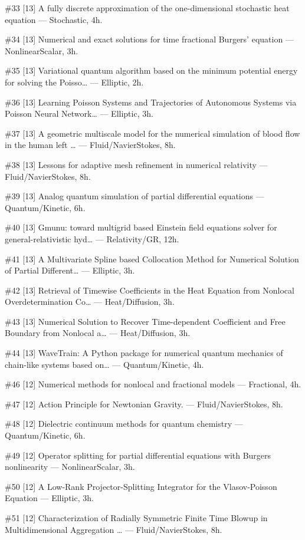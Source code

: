 \documentclass[10pt,letterpaper]{article}
\begin{document}
\#33 [13] A fully discrete approximation of the one-dimensional stochastic heat equation — Stochastic, 4h.

\#34 [13] Numerical and exact solutions for time fractional Burgers' equation — NonlinearScalar, 3h.

\#35 [13] Variational quantum algorithm based on the minimum potential energy for solving the Poisso… — Elliptic, 2h.

\#36 [13] Learning Poisson Systems and Trajectories of Autonomous Systems via Poisson Neural Network… — Elliptic, 3h.

\#37 [13] A geometric multiscale model for the numerical simulation of blood flow in the human left … — Fluid/NavierStokes, 8h.

\#38 [13] Lessons for adaptive mesh refinement in numerical relativity — Fluid/NavierStokes, 8h.

\#39 [13] Analog quantum simulation of partial differential equations — Quantum/Kinetic, 6h.

\#40 [13] Gmunu: toward multigrid based Einstein field equations solver for general-relativistic hyd… — Relativity/GR, 12h.

\#41 [13] A Multivariate Spline based Collocation Method for Numerical Solution of Partial Different… — Elliptic, 3h.

\#42 [13] Retrieval of Timewise Coefficients in the Heat Equation from Nonlocal Overdetermination Co… — Heat/Diffusion, 3h.

\#43 [13] Numerical Solution to Recover Time-dependent Coefficient and Free Boundary from Nonlocal a… — Heat/Diffusion, 3h.

\#44 [13] WaveTrain: A Python package for numerical quantum mechanics of chain-like systems based on… — Quantum/Kinetic, 4h.

\#46 [12] Numerical methods for nonlocal and fractional models — Fractional, 4h.

\#47 [12] Action Principle for Newtonian Gravity. — Fluid/NavierStokes, 8h.

\#48 [12] Dielectric continuum methods for quantum chemistry — Quantum/Kinetic, 6h.

\#49 [12] Operator splitting for partial differential equations with Burgers nonlinearity — NonlinearScalar, 3h.

\#50 [12] A Low-Rank Projector-Splitting Integrator for the Vlasov-Poisson Equation — Elliptic, 3h.

\#51 [12] Characterization of Radially Symmetric Finite Time Blowup in Multidimensional Aggregation … — Fluid/NavierStokes, 8h.
\end{document}
